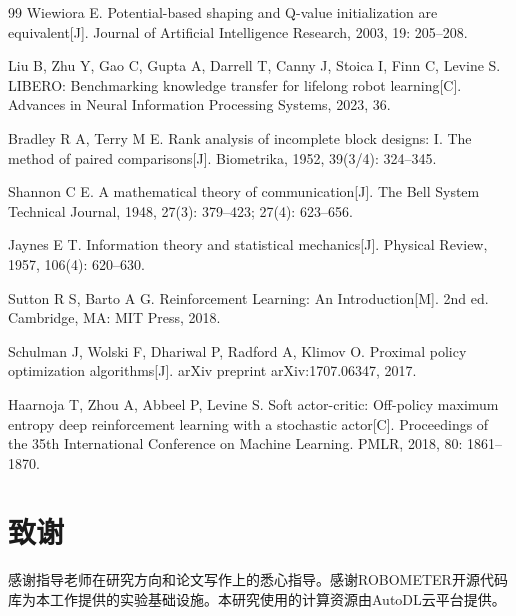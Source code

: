 \begin{thebibliography}{99}
Wiewiora E.
Potential-based shaping and Q-value initialization are equivalent[J].
Journal of Artificial Intelligence Research, 2003, 19: 205--208.

Liu B, Zhu Y, Gao C, Gupta A, Darrell T, Canny J, Stoica I, Finn C, Levine S.
LIBERO: Benchmarking knowledge transfer for lifelong robot learning[C].
Advances in Neural Information Processing Systems, 2023, 36.

Bradley R A, Terry M E.
Rank analysis of incomplete block designs: I. The method of paired comparisons[J].
Biometrika, 1952, 39(3/4): 324--345.

Shannon C E.
A mathematical theory of communication[J].
The Bell System Technical Journal, 1948, 27(3): 379--423; 27(4): 623--656.

Jaynes E T.
Information theory and statistical mechanics[J].
Physical Review, 1957, 106(4): 620--630.

Sutton R S, Barto A G.
Reinforcement Learning: An Introduction[M].
2nd ed. Cambridge, MA: MIT Press, 2018.

Schulman J, Wolski F, Dhariwal P, Radford A, Klimov O.
Proximal policy optimization algorithms[J].
arXiv preprint arXiv:1707.06347, 2017.

Haarnoja T, Zhou A, Abbeel P, Levine S.
Soft actor-critic: Off-policy maximum entropy deep reinforcement learning with a stochastic actor[C].
Proceedings of the 35th International Conference on Machine Learning. PMLR, 2018, 80: 1861--1870.

\end{thebibliography}



\clearpage
\section*{致谢}

感谢指导老师在研究方向和论文写作上的悉心指导。感谢ROBOMETER\cite{liang2026}开源代码库为本工作提供的实验基础设施。本研究使用的计算资源由AutoDL云平台提供。



